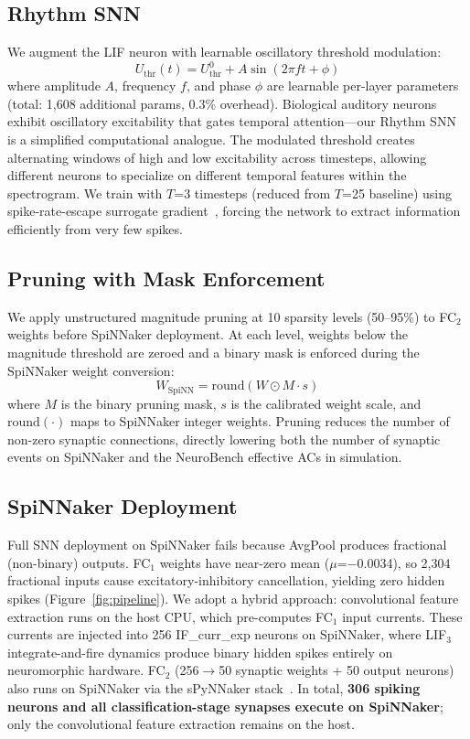 \documentclass[sigconf,nonacm=false]{acmart}
\begin{document}
\subsection{Rhythm SNN}

We augment the LIF neuron with learnable oscillatory threshold modulation:
\begin{equation}
U_\text{thr}(t) = U_\text{thr}^0 + A \sin(2\pi f t + \phi)
\label{eq:rhythm}
\end{equation}
where amplitude $A$, frequency $f$, and phase $\phi$ are learnable per-layer parameters (total: 1{,}608 additional params, 0.3\% overhead).
Biological auditory neurons exhibit oscillatory excitability that gates temporal attention---our Rhythm SNN is a simplified computational analogue.
The modulated threshold creates alternating windows of high and low excitability across timesteps, allowing different neurons to specialize on different temporal features within the spectrogram.
We train with $T$=3 timesteps (reduced from $T$=25 baseline) using spike-rate-escape surrogate gradient~\cite{zenke2021}, forcing the network to extract information efficiently from very few spikes.

\subsection{Pruning with Mask Enforcement}

We apply unstructured magnitude pruning at 10 sparsity levels (50--95\%) to FC$_2$ weights before SpiNNaker deployment.
At each level, weights below the magnitude threshold are zeroed and a binary mask is enforced during the SpiNNaker weight conversion:
\begin{equation}
W_\text{SpiNN} = \text{round}(W \odot M \cdot s)
\end{equation}
where $M$ is the binary pruning mask, $s$ is the calibrated weight scale, and $\text{round}(\cdot)$ maps to SpiNNaker integer weights.
Pruning reduces the number of non-zero synaptic connections, directly lowering both the number of synaptic events on SpiNNaker and the NeuroBench effective ACs in simulation.

\subsection{SpiNNaker Deployment}

Full SNN deployment on SpiNNaker fails because AvgPool produces fractional (non-binary) outputs.
FC$_1$ weights have near-zero mean ($\mu$=$-$0.0034), so 2{,}304 fractional inputs cause excitatory-inhibitory cancellation, yielding zero hidden spikes (Figure~\ref{fig:pipeline}).
We adopt a hybrid approach: convolutional feature extraction runs on the host CPU, which pre-computes FC$_1$ input currents.
These currents are injected into 256 IF\_curr\_exp neurons on SpiNNaker, where LIF$_3$ integrate-and-fire dynamics produce binary hidden spikes entirely on neuromorphic hardware.
FC$_2$ (256$\to$50 synaptic weights + 50 output neurons) also runs on SpiNNaker via the sPyNNaker stack~\cite{rhodes2018}.
In total, \textbf{306 spiking neurons and all classification-stage synapses execute on SpiNNaker}; only the convolutional feature extraction remains on the host.
\end{document}
